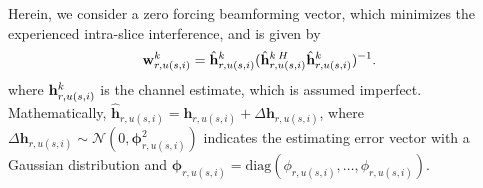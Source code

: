 \documentclass[lettersize,journal]{IEEEtran}
\begin{document}

 Herein, we consider a zero forcing beamforming vector, which minimizes the experienced intra-slice interference, and is given by \cite{huang2013user}
\begin{equation}
\bold{w}_{r,u(s,i)}^{k} = \hat{\bold{h}}_{r,u(s,i)}^{k}(\hat{\bold{h}}_{r,u(s,i)}^{k \: H} \hat{\bold{h}}_{r,u(s,i)}^{k})^{-1}.
\end{equation}
\noindent where $\bold{h}_{r,u(s,i)}^{k}$ is the channel estimate, which is assumed imperfect. Mathematically,
$\hat{\boldsymbol{h}}_{r,u(s,i)} = \boldsymbol{h}_{r,u(s,i)} + \Delta \boldsymbol{h}_{r,u(s,i)}$, where
$\Delta \boldsymbol{h}_{r,u(s,i)}\sim \mathcal{N}(0,\boldsymbol{\phi}_{r,u(s,i)}^2)$ indicates the estimating error vector with a Gaussian distribution and $\boldsymbol{\phi}_{r,u(s,i)} = \text{diag}(\phi_{r,u(s,i)},\ldots,\phi_{r,u(s,i)}).$
\vspace{-3mm}
\end{document}
